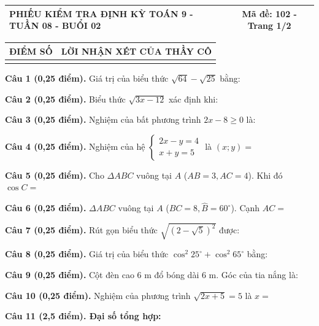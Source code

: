 \documentclass[12pt,a4paper]{article}
\begin{document}
\noindent
\begin{tabularx}{\linewidth}{|X|c|}
\hline
\textbf{PHIẾU KIỂM TRA ĐỊNH KỲ TOÁN 9 - TUẦN 08 - BUỔI 02} & \textbf{Mã đề: 102 - Trang 1/2} \\
\hline
\end{tabularx}

\vspace{1.0mm}

\noindent
\begin{tabularx}{\linewidth}{|p{3.2cm}|X|}
\hline
\centering\textbf{ĐIỂM SỐ} & \centering\textbf{LỜI NHẬN XÉT CỦA THẦY CÔ} \tabularnewline
\hline
\rule{0pt}{1.8cm} & \tabularnewline
\hline
\end{tabularx}

\vspace{1.2mm}
\noindent\textbf{Câu 1 (0,25 điểm).} Giá trị của biểu thức $\sqrt{64} - \sqrt{25}$ bằng: \par\vspace{0.5mm}
\noindent\textbf{Câu 2 (0,25 điểm).} Biểu thức $\sqrt{3x - 12}$ xác định khi: \par\vspace{0.5mm}
\noindent\textbf{Câu 3 (0,25 điểm).} Nghiệm của bất phương trình $2x - 8 \ge 0$ là: \par\vspace{0.5mm}
\noindent\textbf{Câu 4 (0,25 điểm).} Nghiệm của hệ $\begin{cases} 2x - y = 4 \\ x + y = 5 \end{cases}$ là $(x; y) =$ \par\vspace{0.5mm}
\noindent\textbf{Câu 5 (0,25 điểm).} Cho $\Delta ABC$ vuông tại $A$ ($AB=3, AC=4$). Khi đó $\cos C =$ \par\vspace{0.5mm}
\noindent\textbf{Câu 6 (0,25 điểm).} $\Delta ABC$ vuông tại $A$ ($BC = 8, \widehat{B}=60^\circ$). Cạnh $AC =$ \par\vspace{0.5mm}
\noindent\textbf{Câu 7 (0,25 điểm).} Rút gọn biểu thức $\sqrt{(2 - \sqrt{5})^2}$ được: \par\vspace{0.5mm}
\noindent\textbf{Câu 8 (0,25 điểm).} Giá trị của biểu thức $\cos^2 25^\circ + \cos^2 65^\circ$ bằng: \par\vspace{0.5mm}
\noindent\textbf{Câu 9 (0,25 điểm).} Cột đèn cao $6\text{ m}$ đổ bóng dài $6\text{ m}$. Góc của tia nắng là: \par\vspace{0.5mm}
\noindent\textbf{Câu 10 (0,25 điểm).} Nghiệm của phương trình $\sqrt{2x + 5} = 5$ là $x =$ \par\vspace{0.5mm}
\vspace{0.8mm}
\noindent\textbf{Câu 11 (2,5 điểm). Đại số tổng hợp:}
\vspace{0.6mm}
\end{document}
